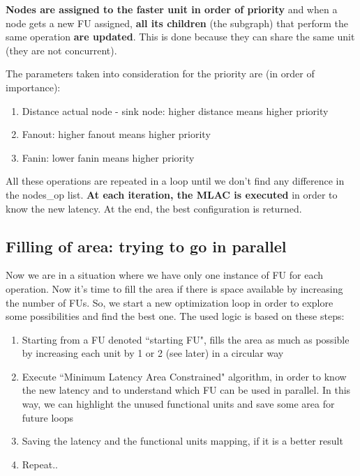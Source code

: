 \documentclass{article}
\begin{document}
	\textbf{Nodes are assigned to the faster unit in order of priority} and when a node gets a new FU assigned, \textbf{all its children} (the subgraph) that perform the same operation \textbf{are updated}. This is done because they can share the same unit (they are not concurrent).
	
	The parameters taken into consideration for the priority are (in order of importance):
	
	\begin{enumerate}
		\itemsep0sp
		\item Distance actual node - sink node: higher distance means higher priority
		\item Fanout: higher fanout means higher priority
		\item Fanin: lower fanin means higher priority
	\end{enumerate}
	
	All these operations are repeated in a loop until we don't find any difference in the nodes\_op list. \textbf{At each iteration, the MLAC is executed} in order to know the new latency. At the end, the best configuration is returned.
	
	
	\subsection{Filling of area: trying to go in parallel}
	
	Now we are in a situation where we have only one instance of FU for each operation. Now it's time to fill the area if there is space available by increasing the number of FUs. So, we start a new optimization loop in order to explore some possibilities and find the best one. The used logic is based on these steps:
	
	\begin{enumerate}
	
		\item Starting from a FU denoted ``starting FU", fills the area as much as possible by increasing each unit by 1 or 2 (see later) in a circular way
		\item Execute ``Minimum Latency Area Constrained" algorithm, in order to know the new latency and to understand which FU can be used in parallel. In this way, we can highlight the unused functional units and save some area for future loops
		\item Saving the latency and the functional units mapping, if it is a better result
		\item Repeat..
	\end{enumerate}
	
\end{document}
